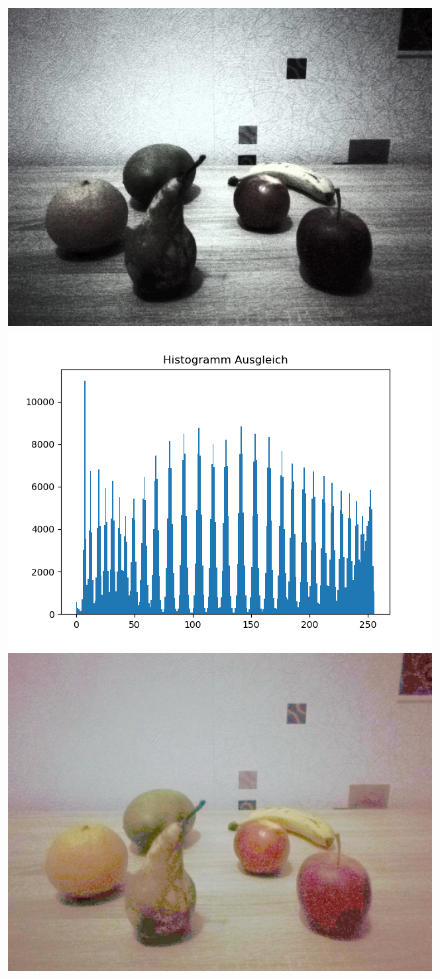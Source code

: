\begin{appendices}
\begin{figure}[htbp]
\begin{minipage}{0.49\textwidth}
\end{minipage}
\begin{minipage}{0.49\textwidth}
\includegraphics[width=.8\textwidth]{Sources/Anhang/resize_0250_HA.jpg}
\end{minipage}
\begin{minipage}{0.49\textwidth}
\includegraphics[width=\textwidth]{Sources/Anhang/resize_0250_HA.png}
\end{minipage}
\begin{minipage}{0.49\textwidth}
\includegraphics[width=.8\textwidth]{Sources/Anhang/resize_0250_HS.jpg}

\end{minipage}
\end{figure}
\end{appendices}
